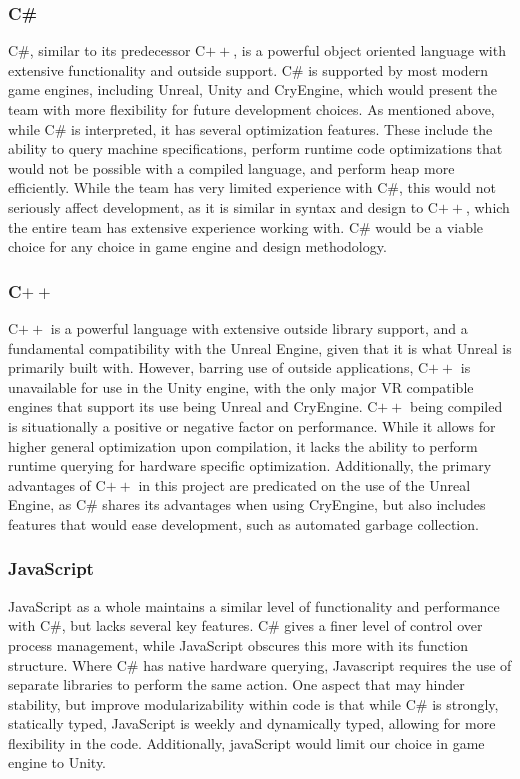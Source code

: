 \documentclass[onecolumn, draftclsnofoot,10pt, compsoc]{IEEEtran}
\begin{document}
\subsubsection{C\#}
C\#, similar to its predecessor C$++$, is a powerful object oriented language with extensive functionality and outside support. C\# is supported by most modern game engines, including Unreal, Unity and CryEngine, which would present the team with more flexibility for future development choices. As mentioned above, while C\# is interpreted, it has several optimization features. These include the ability to query machine specifications, perform runtime code optimizations that would not be possible with a compiled language, and perform heap more efficiently. While the team has very limited experience with C\#, this would not seriously affect development, as it is similar in syntax and design to C$++$, which the entire team has extensive experience working with. C\# would be a viable choice for any choice in game engine and design methodology.\cite{1}\cite{2}

\subsubsection{C$++$}
C$++$ is a powerful language with extensive outside library support, and a fundamental compatibility with the Unreal Engine, given that it is what Unreal is primarily built with. However, barring use of outside applications, C$++$ is unavailable for use in the Unity engine, with the only major VR compatible engines that support its use being Unreal and CryEngine. C$++$ being compiled is situationally a positive or negative factor on performance. While it allows for higher general optimization upon compilation, it lacks the ability to perform runtime querying for hardware specific optimization. Additionally, the primary advantages of C$++$ in this project are predicated on the use of the Unreal Engine, as C\# shares its advantages when using CryEngine, but also includes features that would ease development, such as automated garbage collection.\cite{3}

\subsubsection{JavaScript}
JavaScript as a whole maintains a similar level of functionality and performance with C\#, but lacks several key features. C\# gives a finer level of control over process management, while JavaScript obscures this more with its function structure. Where C\# has native hardware querying, Javascript requires the use of separate libraries to perform the same action. One aspect that may hinder stability, but improve modularizability within code is that while C\# is strongly, statically typed, JavaScript is weekly and dynamically typed, allowing for more flexibility in the code. Additionally, javaScript would limit our choice in game engine to Unity.
\end{document}
